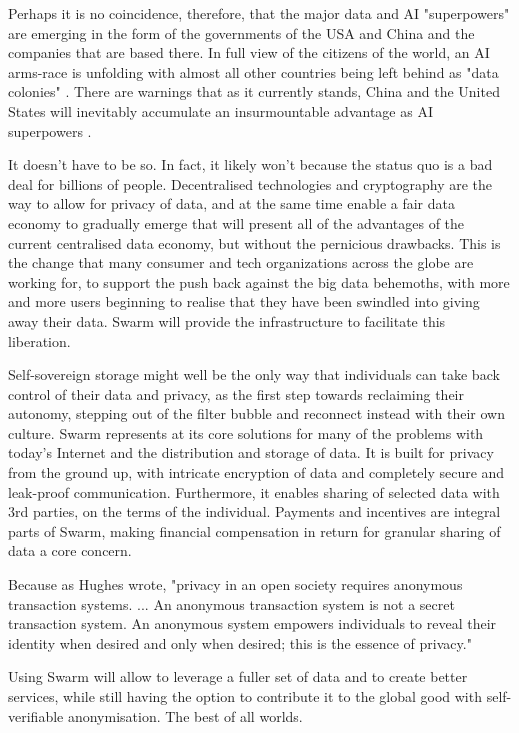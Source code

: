 Perhaps it is no coincidence, therefore, that the major data and AI "superpowers" are emerging in the form of the governments of the USA and China and the companies that are based there. In full view of the citizens of the world, an AI arms-race is unfolding with almost all other countries being left behind as "data colonies" \cite{HarariDavos2020Mar}. There are warnings that as it currently stands, China and the United States will inevitably accumulate an insurmountable advantage as AI superpowers \cite{Lee2018Sep}.

It doesn't have to be so. In fact, it likely won't because the status quo is a bad deal for billions of people. Decentralised technologies and cryptography are the way to allow for privacy of data, and at the same time enable a fair data economy to gradually emerge that will present all of the advantages of the current centralised data economy, but without the pernicious drawbacks. This is the change that many consumer and tech organizations across the globe are working for, to support the push back against the big data behemoths, with more and more users beginning to realise that they have been swindled into giving away their data. Swarm will provide the infrastructure to facilitate this liberation.

Self-sovereign storage might well be the only way that individuals can take back control of their data and privacy, as the first step towards reclaiming their autonomy, stepping out of the filter bubble and reconnect instead with their own culture. Swarm represents at its core solutions for many of the problems with today's Internet and the distribution and storage of data. It is built for privacy from the ground up, with intricate encryption of data and completely secure and leak-proof communication. Furthermore, it enables sharing of selected data with 3rd parties, on the terms of the individual. Payments and incentives are integral parts of Swarm, making financial compensation in return for granular sharing of data a core concern.

Because as Hughes wrote, "privacy in an open society requires anonymous transaction systems. ... An anonymous transaction system is not a secret transaction system. An anonymous system empowers individuals to reveal their identity when desired and only when desired; this is the essence of privacy."

Using Swarm will allow to leverage a fuller set of data and to create better services, while still having the option to contribute it to the global good with self-verifiable anonymisation. The best of all worlds.

